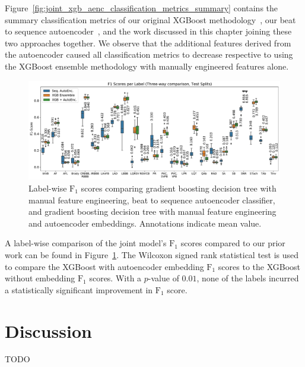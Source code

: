 \documentclass[\main/thesis.tex]{subfiles}
\begin{document}
Figure~\ref{fig:joint_xgb_aenc_classification_metrics_summary} contains the summary classification metrics of our original XGBoost methodology~\cite{wong2020CINC-multilabel-ECG}, our beat to sequence autoencoder~\cite{wong2021ICASSP-multilabel-ECG}, and the work discussed in this chapter joining these two approaches together.
We observe that the additional features derived from the autoencoder caused all classification metrics to decrease respective to using the XGBoost ensemble methodology with manually engineered features alone.

\begin{figure}[ht]
    \centering
    \includegraphics[width=14cm]{figure/label_f1s_3_way.pdf}
    \caption[Label-wise $\text{F}_1$ scores comparing gradient boosting decision tree with manual feature engineering, beat to sequence autoencoder classifier, and gradient boosting decision tree with manual feature engineering and autoencoder embeddings.]{Label-wise $\text{F}_1$ scores comparing gradient boosting decision tree with manual feature engineering, beat to sequence autoencoder classifier, and gradient boosting decision tree with manual feature engineering and autoencoder embeddings. Annotations indicate mean value.}
    \label{fig:joint_xgb_aenc_f1_score}
\end{figure}

A label-wise comparison of the joint model's $\text{F}_1$ scores compared to our prior work can be found in Figure~\ref{fig:joint_xgb_aenc_f1_score}.
The Wilcoxon signed rank statistical test is used to compare the XGBoost with autoencoder embedding $\text{F}_1$ scores to the XGBoost without embedding $\text{F}_1$ scores.
With a $p$-value of $0.01$, none of the labels incurred a statistically significant improvement in $\text{F}_1$ score.

\section{Discussion}
TODO
\end{document}

